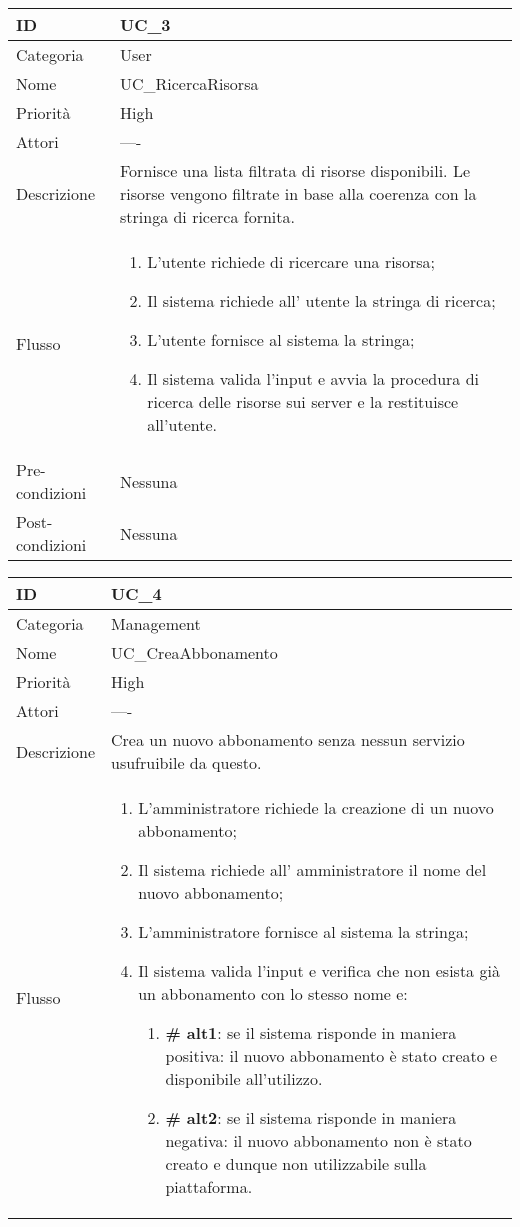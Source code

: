 \begin{center}
\begin{tabular}{ |p{2cm}|p{13cm}|  }
\hline
ID & UC\_3 \\\hline
Categoria & User \\\hline
Nome & UC\_RicercaRisorsa\\\hline
Priorità & High \\\hline
Attori &  ---- \\\hline
Descrizione & Fornisce una lista filtrata di risorse disponibili. Le risorse vengono filtrate in base alla coerenza con la stringa di ricerca fornita.\\\hline
Flusso &  	\begin{enumerate}
			\item L'utente richiede di ricercare una risorsa;
			\item Il sistema richiede all' utente la stringa di ricerca;
			\item L'utente fornisce al sistema la stringa;
			\item Il sistema valida l'input e avvia la procedura di ricerca delle risorse sui server e la restituisce all'utente. %
			
		\end{enumerate}\\\hline
Pre-condizioni &  Nessuna\\\hline
Post-condizioni &  Nessuna\\\hline
\end{tabular}
\label{table_use_case:3}\newline

\begin{tabular}{ |p{2cm}|p{13cm}|  }
\hline
ID & UC\_4 \\\hline
Categoria & Management\\\hline
Nome & UC\_CreaAbbonamento\\\hline
Priorità & High \\\hline
Attori &  ---- \\\hline
Descrizione & Crea un nuovo abbonamento senza nessun servizio usufruibile da questo.\\\hline
Flusso &  	\begin{enumerate}
			\item L'amministratore richiede la creazione di un nuovo abbonamento;
			\item Il sistema richiede all' amministratore il nome del nuovo abbonamento;
			\item L'amministratore fornisce al sistema la stringa;
			\item Il sistema valida l'input e verifica che non esista già un abbonamento con lo stesso nome e:
				\begin{enumerate}[  ]
					\item \textbf{\# alt1}: se il sistema risponde in maniera positiva: il nuovo abbonamento è stato creato e disponibile all'utilizzo.
					\item \textbf{\# alt2}: se il sistema risponde in maniera negativa: il nuovo abbonamento non è stato creato e dunque non utilizzabile sulla piattaforma.
				\end{enumerate}
			

\end{enumerate}
\end{tabular}
\end{center}
